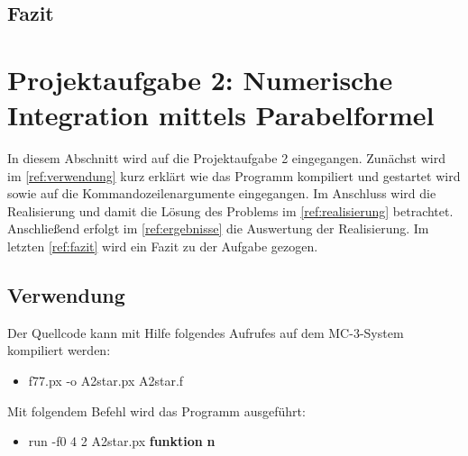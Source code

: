 \subsection{Fazit}

\pagebreak

\section{Projektaufgabe 2: Numerische Integration mittels Parabelformel}
\lstset{language=Fortran,frame=none, keepspaces=false, basicstyle=\footnotesize,showstringspaces=false}  
In diesem Abschnitt wird auf die Projektaufgabe 2 eingegangen.
Zunächst wird im \autoref{ref:verwendung} kurz erklärt wie das Programm kompiliert und gestartet wird sowie auf die Kommandozeilenargumente eingegangen. 
Im Anschluss wird die Realisierung und damit die Lösung des Problems im \autoref{ref:realisierung} betrachtet.
Anschließend erfolgt im \autoref{ref:ergebnisse} die Auswertung der Realisierung.
Im letzten \autoref{ref:fazit} wird ein Fazit zu der Aufgabe gezogen. 

\subsection{Verwendung}
\label{ref:verwendung}
Der Quellcode kann mit Hilfe folgendes Aufrufes auf dem MC-3-System kompiliert werden:
\begin{itemize}
	\item f77.px -o A2star.px A2star.f
\end{itemize}
Mit folgendem Befehl wird das Programm ausgeführt:
\begin{itemize}
	\item run -f0 4 2 A2star.px \textbf{funktion} \textbf{n}
\end{itemize}

